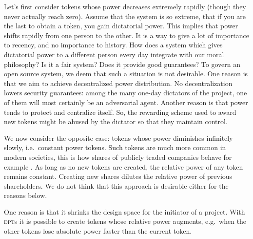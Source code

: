 Let's first consider tokens whose power decreases extremely rapidly (though they never actually reach zero).
Assume that the system is so extreme, that if you are the last to obtain a token, you gain dictatorial power.
This implies that power shifts rapidly from one person to the other.
It is a way to give a lot of importance to recency, and no importance to history.
How does a system which gives dictatorial power to a different person every day integrate with our moral philosophy?
Is it a fair system?
Does it provide good guarantees?
To govern an open source system, we deem that such a situation is not desirable.
One reason is that we aim to achieve decentralized power distribution.
No decentralization lowers security guarantees: among the many one-day dictators of the project, one of them will most certainly be an adversarial agent.
Another reason is that power tends to protect and centralize itself.
So, the rewarding scheme used to award new tokens might be abused by the dictator so that they maintain control.

We now consider the opposite case: tokens whose power diminishes infinitely slowly, i.e.\ constant power tokens.
Such tokens are much more common in modern societies, this is how shares of publicly traded companies behave for example%
.
As long as no new tokens are created, the relative power of any token remains constant.
Creating new shares dilutes the relative power of previous shareholders.
We do not think that this approach is desirable either for the reasons below.

One reason is that it shrinks the design space for the initiator of a project.
With \textsc{dpt}s it is possible to create tokens whose relative power augments, e.g.\ when the other tokens lose absolute power faster than the current token.

